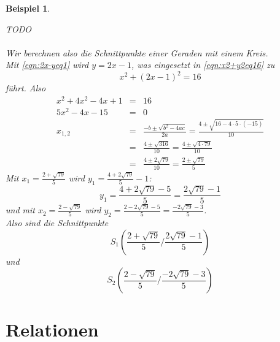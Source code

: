 \documentclass{report}
\newtheorem{myexample}{Beispiel}
\begin{document}
\begin{myexample}
\begin{enumerate}
\begin{enumerate}
TODO\\\\ %
Wir berechnen also die Schnittpunkte einer Geraden mit einem Kreis.\\
Mit \ref{eqn:2x-yeq1} wird $y=2x-1$, was eingesetzt in \ref{eqn:x2+y2eq16} zu
\begin{equation}x^2 + (2x-1)^2 = 16\end{equation}
führt. Also
\begin{eqnarray}x^2 + 4x^2 - 4x + 1 & = & 16\nonumber \\
5x^2 - 4x -15 & = & 0\nonumber \\
x_{1,2} & = & \frac{-b \pm \sqrt{b^2 - 4ac}}{2a} = \frac{4 \pm \sqrt{16 - 4 \cdot 5 \cdot (-15)}}{10}\nonumber \\
&=& \frac{4 \pm \sqrt{316}}{10} = \frac{4 \pm \sqrt{4 \cdot 79}}{10}\nonumber \\
&=& \frac{4 \pm 2 \sqrt{79}}{10} = \frac{2 \pm \sqrt{79}}{5}\end{eqnarray}
Mit $x_1 = \frac{2 + \sqrt{79}}{5}$ wird $y_1 = \frac{4 + 2 \sqrt{79}}{5}-1$:
\begin{equation}y_1 = \frac{4 + 2 \sqrt{79} -5}{5} = \frac{2 \sqrt{79} -1}{5}\end{equation}
und mit $x_2 = \frac{2 - \sqrt{79}}{5}$ wird $y_2 = \frac{2-2\sqrt{79}-5}{5} = \frac{-2 \sqrt{79}-3}{5}$.\\
Also sind die Schnittpunkte
\begin{equation}S_1(\frac{2+\sqrt{79}}{5}/\frac{2 \sqrt{79}-1}{5})\end{equation}
und
\begin{equation}S_2(\frac{2-\sqrt{79}}{5}/\frac{-2 \sqrt{79}-3}{5})\end{equation}
\end{enumerate}
\end{enumerate}
\end{myexample}

\chapter{Relationen}
\end{document}
